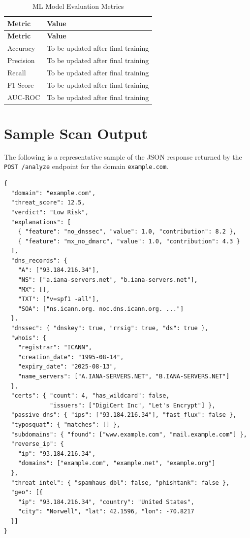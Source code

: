 \documentclass[12pt, a4paper, oneside]{report}
\begin{document}
\begin{longtable}{|p{5cm}|p{4cm}|}
\caption{ML Model Evaluation Metrics}\\
\hline
\rowcolor{nfsuBlue!15}
\textbf{Metric} & \textbf{Value} \\
\hline
\endfirsthead
\hline
\rowcolor{nfsuBlue!15}
\textbf{Metric} & \textbf{Value} \\
\hline
\endhead
\hline
\endfoot
Accuracy & To be updated after final training \\
\hline
Precision & To be updated after final training \\
\hline
Recall & To be updated after final training \\
\hline
F1 Score & To be updated after final training \\
\hline
AUC-ROC & To be updated after final training \\
\hline
\end{longtable}

\chapter{Sample Scan Output}
\label{app:sample}

The following is a representative sample of the JSON response returned by the \texttt{POST /analyze} endpoint for the domain \texttt{example.com}.

\begin{verbatim}
{
  "domain": "example.com",
  "threat_score": 12.5,
  "verdict": "Low Risk",
  "explanations": [
    { "feature": "no_dnssec", "value": 1.0, "contribution": 8.2 },
    { "feature": "mx_no_dmarc", "value": 1.0, "contribution": 4.3 }
  ],
  "dns_records": {
    "A": ["93.184.216.34"],
    "NS": ["a.iana-servers.net", "b.iana-servers.net"],
    "MX": [],
    "TXT": ["v=spf1 -all"],
    "SOA": ["ns.icann.org. noc.dns.icann.org. ..."]
  },
  "dnssec": { "dnskey": true, "rrsig": true, "ds": true },
  "whois": {
    "registrar": "ICANN",
    "creation_date": "1995-08-14",
    "expiry_date": "2025-08-13",
    "name_servers": ["A.IANA-SERVERS.NET", "B.IANA-SERVERS.NET"]
  },
  "certs": { "count": 4, "has_wildcard": false,
             "issuers": ["DigiCert Inc", "Let's Encrypt"] },
  "passive_dns": { "ips": ["93.184.216.34"], "fast_flux": false },
  "typosquat": { "matches": [] },
  "subdomains": { "found": ["www.example.com", "mail.example.com"] },
  "reverse_ip": {
    "ip": "93.184.216.34",
    "domains": ["example.com", "example.net", "example.org"]
  },
  "threat_intel": { "spamhaus_dbl": false, "phishtank": false },
  "geo": [{
    "ip": "93.184.216.34", "country": "United States",
    "city": "Norwell", "lat": 42.1596, "lon": -70.8217
  }]
}
\end{verbatim}
\end{document}
